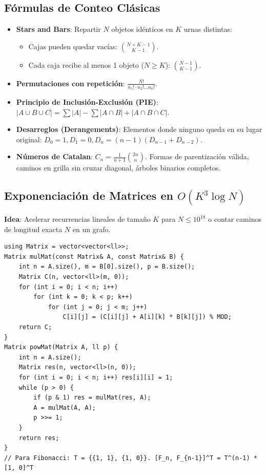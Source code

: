 \documentclass[9pt,twocolumn,a4paper]{extarticle}
\begin{document}
\subsection{Fórmulas de Conteo Clásicas}
\begin{itemize}
    \setlength{\itemsep}{0pt}
    \item \textbf{Stars and Bars}: Repartir $N$ objetos idénticos en $K$ urnas distintas:
    \begin{itemize}
        \item Cajas pueden quedar vacías: $\binom{N + K - 1}{K - 1}$.
        \item Cada caja recibe al menos 1 objeto ($N \ge K$): $\binom{N - 1}{K - 1}$.
    \end{itemize}
    \item \textbf{Permutaciones con repetición}: $\frac{N!}{n_1! \cdot n_2! \dots n_k!}$.
    \item \textbf{Principio de Inclusión-Exclusión (PIE)}:
    $|A \cup B \cup C| = \sum |A| - \sum |A \cap B| + |A \cap B \cap C|$.
    \item \textbf{Desarreglos (Derangements)}: Elementos donde ninguno queda en su lugar original: $D_0 = 1, D_1 = 0, D_n = (n-1)(D_{n-1} + D_{n-2})$.
    \item \textbf{Números de Catalan}: $C_n = \frac{1}{n+1}\binom{2n}{n}$. Formas de parentización válida, caminos en grilla sin cruzar diagonal, árboles binarios completos.
\end{itemize}

\subsection{Exponenciación de Matrices en $O(K^3 \log N)$}
\textbf{Idea}: Acelerar recurrencias lineales de tamaño $K$ para $N \le 10^{18}$ o contar caminos de longitud exacta $N$ en un grafo.
\begin{lstlisting}
using Matrix = vector<vector<ll>>;
Matrix mulMat(const Matrix& A, const Matrix& B) {
    int n = A.size(), m = B[0].size(), p = B.size();
    Matrix C(n, vector<ll>(m, 0));
    for (int i = 0; i < n; i++)
        for (int k = 0; k < p; k++)
            for (int j = 0; j < m; j++)
                C[i][j] = (C[i][j] + A[i][k] * B[k][j]) % MOD;
    return C;
}
Matrix powMat(Matrix A, ll p) {
    int n = A.size();
    Matrix res(n, vector<ll>(n, 0));
    for (int i = 0; i < n; i++) res[i][i] = 1;
    while (p > 0) {
        if (p & 1) res = mulMat(res, A);
        A = mulMat(A, A);
        p >>= 1;
    }
    return res;
}
// Para Fibonacci: T = {{1, 1}, {1, 0}}. [F_n, F_{n-1}]^T = T^(n-1) * [1, 0]^T
\end{lstlisting}
\end{document}
